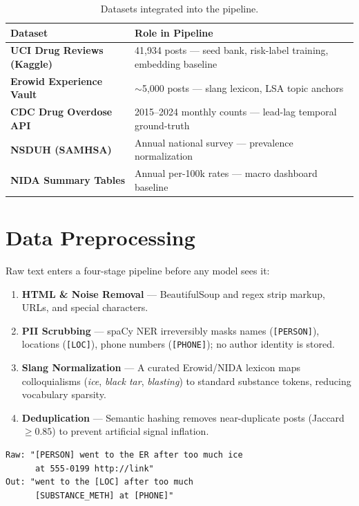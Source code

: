 \documentclass[10pt,twocolumn]{article}
\begin{document}
\begin{table}[H]
\centering
\caption{Datasets integrated into the pipeline.}
\scriptsize
\begin{tabularx}{\columnwidth}{@{}>{\bfseries}lX@{}}
  \toprule
  Dataset & Role in Pipeline \\
  \midrule
  UCI Drug Reviews (Kaggle) & 41,934 posts — seed bank, risk-label training, embedding baseline \\
  Erowid Experience Vault   & $\sim$5,000 posts — slang lexicon, LSA topic anchors \\
  CDC Drug Overdose API     & 2015--2024 monthly counts — lead-lag temporal ground-truth \\
  NSDUH (SAMHSA)            & Annual national survey — prevalence normalization \\
  NIDA Summary Tables       & Annual per-100k rates — macro dashboard baseline \\
  \bottomrule
\end{tabularx}
\end{table}

\section{Data Preprocessing}

Raw text enters a four-stage pipeline before any model sees it:

\begin{enumerate}[leftmargin=*, noitemsep, topsep=2pt]
  \item \textbf{HTML \& Noise Removal} — BeautifulSoup and regex strip markup, URLs, and special characters.
  \item \textbf{PII Scrubbing} — spaCy NER irreversibly masks names (\texttt{[PERSON]}), locations (\texttt{[LOC]}), phone numbers (\texttt{[PHONE]}); no author identity is stored.
  \item \textbf{Slang Normalization} — A curated Erowid/NIDA lexicon maps colloquialisms (\emph{ice}, \emph{black tar}, \emph{blasting}) to standard substance tokens, reducing vocabulary sparsity.
  \item \textbf{Deduplication} — Semantic hashing removes near-duplicate posts (Jaccard $\geq 0.85$) to prevent artificial signal inflation.
\end{enumerate}

\begin{lstlisting}
Raw: "[PERSON] went to the ER after too much ice
      at 555-0199 http://link"
Out: "went to the [LOC] after too much
      [SUBSTANCE_METH] at [PHONE]"
\end{lstlisting}
\end{document}
